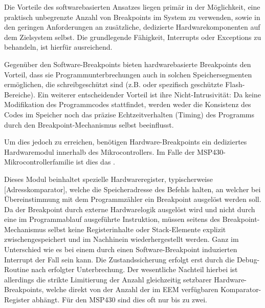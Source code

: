 Die Vorteile des softwarebasierten Ansatzes liegen prim\"ar in der M\"oglichkeit, eine praktisch unbegrenzte Anzahl von Breakpoints im System zu verwenden, sowie in den geringen Anforderungen an zus\"atzliche, dedizierte Hardwarekomponenten auf dem Zielsystem selbst. Die grundlegende F\"ahigkeit, Interrupts oder Exceptions zu behandeln, ist hierf\"ur ausreichend. 

Gegen\"uber den Software-Breakpoints bieten hardwarebasierte Breakpoints den Vorteil, dass sie Programmunterbrechungen auch in solchen Speichersegmenten erm\"oglichen, die schreibgesch\"utzt sind (z.B.  oder spezifisch gesch\"utzte Flash-Bereiche). Ein weiterer entscheidender Vorteil ist ihre Nicht-Intrusivit\"at: Da keine Modifikation des Programmcodes stattfindet, werden weder die Konsistenz des Codes im Speicher noch das pr\"azise Echtzeitverhalten (Timing) des Programms durch den Breakpoint-Mechanismus selbst beeinflusst. 

\newpage
Um dies jedoch zu erreichen, ben\"otigen Hardware-Breakpoints ein dediziertes Hardwaremodul innerhalb des Mikrocontrollers. Im Falle der MSP430-Mikrocontrollerfamilie ist dies das .  

Dieses Modul beinhaltet spezielle Hardwareregister, typischerweise [Adresskomparator], welche die Speicheradresse des Befehls halten, an welcher bei \"Ubereinstimmung mit dem Programmz\"ahler ein Breakpoint ausgel\"ost werden soll. Da der Breakpoint durch externe Hardwarelogik ausgel\"ost wird und nicht durch eine im Programmablauf ausgef\"uhrte Instruktion, m\"ussen seitens des Breakpoint-Mechanismus selbst keine Registerinhalte oder Stack-Elemente explizit zwischengespeichert und im Nachhinein wiederhergestellt werden. Ganz im Unterschied wie es bei einem durch einen Software-Breakpoint induzierten Interrupt der Fall sein kann. Die Zustandssicherung erfolgt erst durch die Debug-Routine nach erfolgter Unterbrechung. Der wesentliche Nachteil hierbei ist allerdings die strikte Limitierung der Anzahl gleichzeitig setzbarer Hardware-Breakpoints, welche direkt von der Anzahl der im EEM verf\"ugbaren Komparator-Register abh\"angt. F\"ur den MSP430 sind dies oft nur bis zu zwei. 

